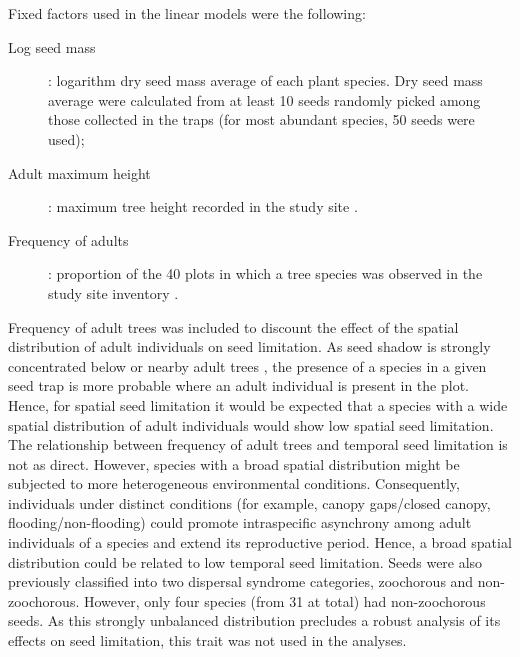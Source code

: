 \documentclass[A4]{article}
\begin{document}
Fixed factors used in the linear models were the following:
\begin{description}
\item[Log seed mass]: logarithm dry seed mass average of each plant
  species. Dry seed mass average were calculated from at least 10
  seeds randomly picked among those collected in the traps (for most
  abundant species, 50 seeds were used);
\item[Adult maximum height]: maximum tree height recorded in the study
  site \cite{pansonato2018}.
\item[Frequency of adults]: proportion of the 40 plots in which a tree
  species was observed in the study site inventory
  \cite{pansonato2018}.
\end{description}


Frequency of adult trees was included to discount the effect of the
spatial distribution of adult individuals on seed limitation. As seed
shadow is strongly concentrated below or nearby adult trees
\cite{flores2013introduced,larios2018}, the presence of a species in a
given seed trap is more probable where an adult individual is present
in the plot. Hence, for spatial seed limitation it would be expected
that a species with a wide spatial distribution of adult individuals
would show low spatial seed limitation. The relationship between
frequency of adult trees and temporal seed limitation is not as
direct. However, species with a broad spatial distribution might be
subjected to more heterogeneous environmental
conditions. Consequently, individuals under distinct conditions (for
example, canopy gaps/closed canopy, flooding/non-flooding) could
promote intraspecific asynchrony among adult individuals of a species
and extend its reproductive period. Hence, a broad spatial
distribution could be related to low temporal seed limitation. Seeds
were also previously classified into two dispersal syndrome
categories, zoochorous and non-zoochorous. However, only four species
(from 31 at total) had non-zoochorous seeds. As this strongly
unbalanced distribution precludes a robust analysis of its effects on
seed limitation, this trait was not used in the analyses.
\end{document}
